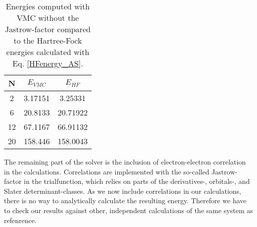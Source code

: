 	\begin{table}[h]
		\begin{centering}
			\begin{tabular}{ccc}
				N & $E_{VMC}$ & $E_{HF}$ \tabularnewline
				\hline
				2 & 3.17151 & 3.25331 \tabularnewline
				6 & 20.8133 & 20.71922 \tabularnewline
				12 & 67.1167 & 66.91132 \tabularnewline
				20 & 158.446 & 158.0043 \tabularnewline
			\end{tabular}
		\par\end{centering}
		\protect\caption{Energies computed with VMC without the Jastrow-factor compared to the Hartree-Fock energies calculated with Eq. \eqref{HFenergy_AS}. \label{tab:VMCnoJ_vs_HF}}
	\end{table}

	The remaining part of the solver is the inclusion of electron-electron correlation in the calculations. Correlations are implemented with the so-called Jastrow-factor in the trialfunction, which relies on parts of the derivatives-, orbitals-, and Slater determinant-classes. As we now include correlations in our calculations, there is no way to analytically calculate the resulting energy. Therefore we have to check our results against other, independent calculations of the same system as refenrence. 